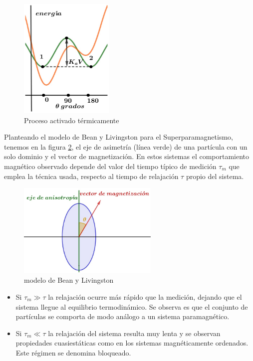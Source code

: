 \begin{figure}[H]
    \centering
    \includegraphics[width=0.4\textwidth]{./Figures/fig36}
	\caption{Proceso activado térmicamente}
	\label{fig:36}    
\end{figure}


Planteando el modelo de Bean y Livingston para el Superparamagnetismo, tenemos en la figura \ref{fig:37}, el eje de asimetría (línea verde) de una partícula con un solo dominio y el vector de magnetización. En estos sistemas el comportamiento magnético observado depende del valor del tiempo típico de medición $\tau_{m}$ que emplea la técnica usada, respecto al tiempo de relajación $\tau$ propio del sistema.

\begin{figure}[H]
    \centering
    \includegraphics[width=0.6\textwidth]{./Figures/fig37}
	\caption{modelo de Bean y Livingston}
	\label{fig:37}    
\end{figure}


\begin{itemize}
	\item Si $\tau_{m}\gg \tau$ la relajación ocurre más rápido que la medición, dejando que el sistema llegue al equilibrio termodinámico. Se observa es que el conjunto de partículas se comporta de modo análogo a un sistema paramagnético.

	\item Si $\tau_{m}\ll \tau$ la relajación del sistema resulta muy lenta y se observan propiedades cuasiestáticas como
en los sistemas magnéticamente ordenados. Este régimen se denomina bloqueado.
\end{itemize}



